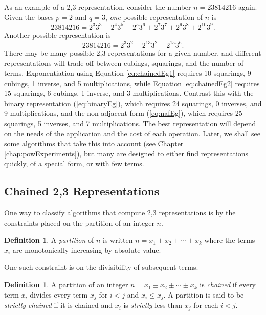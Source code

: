 \documentclass{ucalgthes1}
\theoremstyle{definition}
\newtheorem{defn}[thm]{Definition}
\begin{document}
As an example of a 2,3 representation, consider the number $n=23814216$ again.  Given the bases $p=2$ and $q=3$, \emph{one} possible representation of $n$ is
\begin{equation}
\label{eq:chainedEg1}
	23814216 = 2^3 3^3 - 2^4 3^5 + 2^5 3^6  + 2^7 3^7 + 2^9 3^8 + 2^{10} 3^9.
\end{equation}
Another possible representation is
\begin{equation}
\label{eq:chainedEg2}
	23814216 = 2^3 3^2 -2^{13} 3^2 +2^{15} 3^6.
\end{equation}
There may be many possible 2,3 representations for a given number, and different representations will trade off between cubings, squarings, and the number of terms.  Exponentiation using Equation \ref{eq:chainedEg1} requires 10 squarings, 9 cubings, 1 inverse, and 5 multiplications, while Equation \ref{eq:chainedEg2} requires 15 squarings, 6 cubings, 1 inverse, and 3 multiplications.  Contrast this with the binary representation (\ref{eq:binaryEg}), which requires 24 squarings, 0 inverses, and 9 multiplications, and the non-adjacent form (\ref{eq:nafEg}), which requires 25 squarings, 5 inverses, and 7 multiplications.  The best representation will depend on the needs of the application and the cost of each operation.  Later, we shall see some algorithms that take this into account (see Chapter \ref{chap:powExperiments}), but many are designed to either find representations quickly, of a special form, or with few terms.


\subsection{Chained 2,3 Representations}
\label{subsec:dbnsChains}

One way to classify algorithms that compute 2,3 representations is by the constraints placed on the partition of an integer $n$.

\begin{defn}
A \emph{partition} of $n$ is written $n = x_1 \pm x_2 \pm \cdots \pm x_k$ where the terms $x_i$ are monotonically increasing by absolute value.
\end{defn}

\noindent
One such constraint is on the divisibility of subsequent terms.

\begin{defn}
\label{defn:chained}
A partition of an integer $n = x_1 \pm x_2 \pm \cdots \pm x_k$ is \emph{chained} if every term $x_i$ divides every term $x_j$ for $i < j$ and $x_i \le x_j$. A partition is said to be \emph{strictly chained} if it is chained and $x_i$ is \emph{strictly} less than $x_j$ for each $i < j$.
\end{defn}
\end{document}
